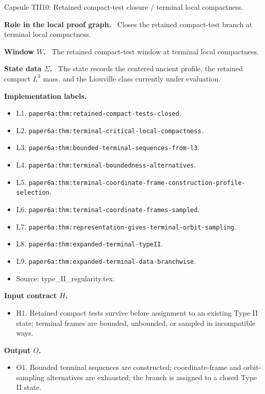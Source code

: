 \documentclass[11pt]{amsart}
\newcommand{\capsulefield}[1]{\par\smallskip\noindent\textbf{#1.}\ }
\begin{document}
\begin{proofcapsule}{Capsule TII10: Retained compact-test closure / terminal local compactness.}
  \capsulefield{Role in the local proof graph}
  Closes the retained compact-test branch at terminal local compactness.

  \capsulefield{Window \(W\)}
The retained compact-test window at terminal local compactness.

  \capsulefield{State data \(\Sigma\)}
The state records the centered ancient profile, the retained compact $L^3$ mass, and the Liouville class currently under evaluation.

  \capsulefield{Implementation labels}
  \begin{itemize}[leftmargin=1.8em]
  \item L1. \texttt{paper6a:thm:retained-compact-tests-closed}.
  \item L2. \texttt{paper6a:thm:terminal-critical-local-compactness}.
  \item L3. \texttt{paper6a:thm:bounded-terminal-sequences-from-l3}.
  \item L4. \texttt{paper6a:thm:terminal-boundedness-alternatives}.
  \item L5. \texttt{paper6a:thm:terminal-coordinate-frame-construction-profile-selection}.
  \item L6. \texttt{paper6a:thm:terminal-coordinate-frames-sampled}.
  \item L7. \texttt{paper6a:thm:representation-gives-terminal-orbit-sampling}.
  \item L8. \texttt{paper6a:thm:expanded-terminal-typeII}.
  \item L9. \texttt{paper6a:thm:expanded-terminal-data-branchwise}.
  \item Source: type\_II\_regularity.tex.
  \end{itemize}

  \capsulefield{Input contract \(H\)}
  \begin{itemize}[leftmargin=1.8em]
  \item H1. Retained compact tests survive before assignment to an existing Type II state; terminal frames are bounded, unbounded, or sampled in incompatible ways.
  \end{itemize}

  \capsulefield{Output \(O\)}
  \begin{itemize}[leftmargin=1.8em]
  \item O1. Bounded terminal sequences are constructed; coordinate-frame and orbit-sampling alternatives are exhausted; the branch is assigned to a closed Type II state.
  \end{itemize}


\end{proofcapsule}
\end{document}
